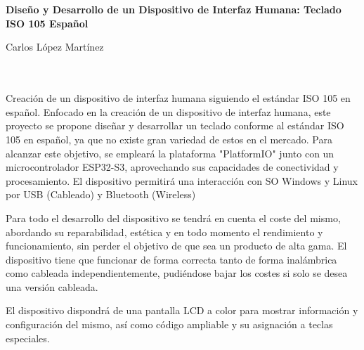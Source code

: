 \chapter*{}






\cleardoublepage
\thispagestyle{empty}

\begin{center}
{\large\bfseries Diseño y Desarrollo de un Dispositivo de Interfaz Humana: Teclado ISO 105 Español}\\
\end{center}
\begin{center}
Carlos López Martínez\\
\end{center}

\\

\vspace{0.7cm}
\\

Creación de un dispositivo de interfaz humana siguiendo el estándar ISO 105 en español. Enfocado en la creación de un dispositivo de interfaz humana, este proyecto se propone diseñar y desarrollar un teclado conforme al estándar ISO 105 en español, ya que no existe gran variedad de estos en el mercado. Para alcanzar este objetivo, se empleará la plataforma "PlatformIO" junto con un microcontrolador ESP32-S3, aprovechando sus capacidades de conectividad y procesamiento. El dispositivo permitirá una interacción con SO Windows y Linux por USB (Cableado) y Bluetooth (Wireless)

Para todo el desarrollo del dispositivo se tendrá en cuenta el coste del mismo, abordando su reparabilidad, estética y en todo momento el rendimiento y funcionamiento, sin perder el objetivo de que sea un producto de alta gama.
El dispositivo tiene que funcionar de forma correcta tanto de forma inalámbrica como cableada independientemente, pudiéndose bajar los costes si solo se desea una versión cableada.

El dispositivo dispondrá de una pantalla LCD a color para mostrar información y configuración del mismo, así como código ampliable y su asignación a teclas especiales.
\cleardoublepage


